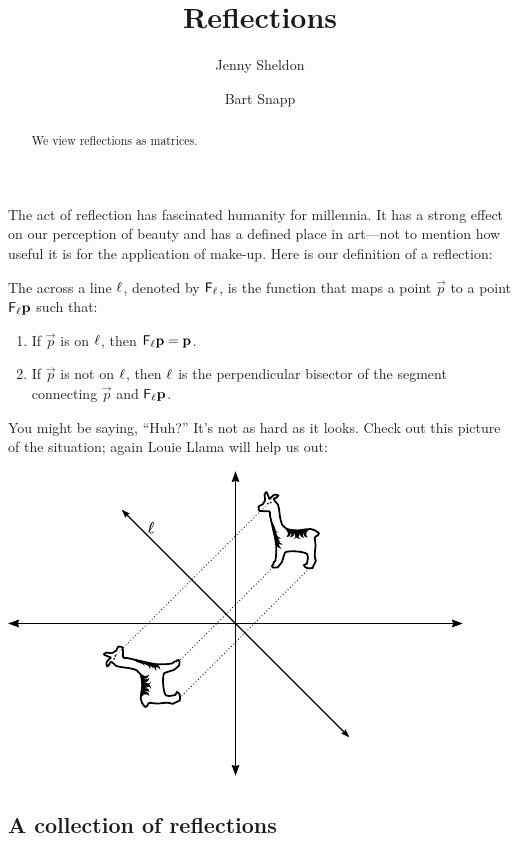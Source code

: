 \documentclass{ximera}
\author{Jenny Sheldon \and Bart Snapp}
\title{Reflections}
\begin{document}
\begin{abstract}
  We view reflections as matrices.
\end{abstract}
\maketitle

The act of reflection has fascinated humanity for millennia.  It has a
strong effect on our perception of beauty and has a defined place in
art---not to mention how useful it is for the application
of make-up. Here is our definition of a reflection:

\begin{definition}
The  across a line $\ell$, denoted by $\mathsf{F}_\ell$, is the
function that maps a point $\vec{p}$ to a point $\mathsf{F}_\ell
\mathbf{p}$ such that:
\begin{enumerate}
\item If $\vec{p}$ is on $\ell$, then $\mathsf{F}_\ell \mathbf{p} = \mathbf{p}$.
\item If $\vec{p}$ is not on $\ell$, then $\ell$ is the perpendicular
  bisector of the segment connecting $\vec{p}$ and $\mathsf{F}_\ell \mathbf{p}$. 
\end{enumerate}
\end{definition}

You might be saying, ``Huh?''  It's not as hard as it looks.  Check
out this picture of the situation; again Louie Llama 
will help us out:
\begin{image}
\includegraphics{refIdeaEg.pdf}
\end{image}

\subsection{A collection of reflections}
\end{document}

